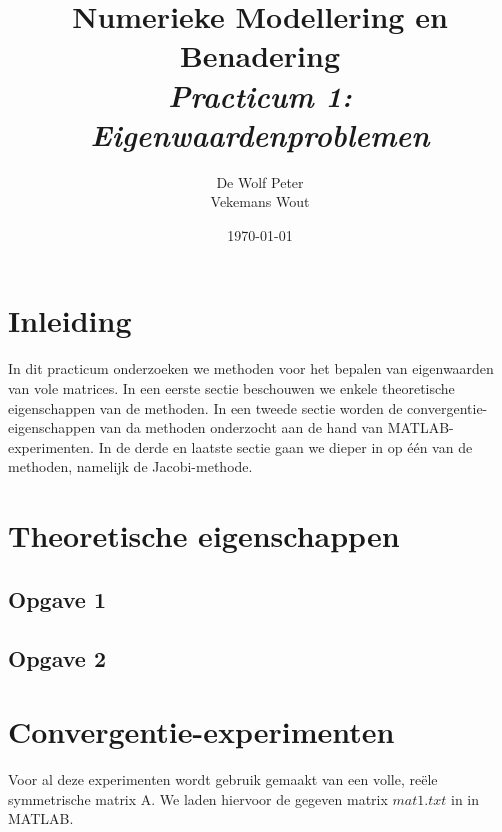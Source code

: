 \documentclass[a4paper, 12pt, titlepage]{report}
\begin{document}
\title{\textbf{Numerieke Modellering en Benadering}\\\textit{Practicum 1: Eigenwaardenproblemen}\\}
\author{De Wolf Peter\\ Vekemans Wout}

\date{\today}
\begin{titlepage}
	\maketitle
	\thispagestyle{empty}
\end{titlepage}

\newpage

\listoffigures

\newpage

\section{Inleiding}
In dit practicum onderzoeken we methoden voor het bepalen van eigenwaarden van vole matrices. In een eerste sectie beschouwen we enkele theoretische eigenschappen van de methoden. In een tweede sectie worden de convergentie-eigenschappen van da methoden onderzocht aan de hand van MATLAB-experimenten. In de derde en laatste sectie gaan we dieper in op \'e\'en van de methoden, namelijk de Jacobi-methode.
\section{Theoretische eigenschappen}

\subsection{Opgave 1}

\subsection{Opgave 2}

\section{Convergentie-experimenten}
Voor al deze experimenten wordt gebruik gemaakt van een volle, re\"ele symmetrische matrix A. We laden hiervoor de gegeven matrix $mat1.txt$ in in MATLAB.
\end{document}
